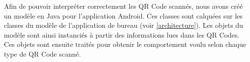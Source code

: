 Afin de pouvoir interpréter correctement les QR Code scannés, nous avons créé un modèle en Java pour l'application Android. Ces classes sont calquées sur les classes du modèle de l'application de bureau (voir \ref{architecture}). Les objets du modèle sont ainsi instanciés à partir des informations lues dans les QR Codes. Ces objets sont ensuite traités pour obtenir le comportement voulu selon chaque type de QR Code scanné.